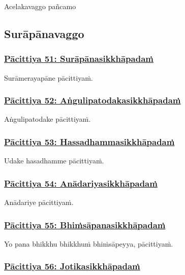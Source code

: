 \begin{center}
  Acelakavaggo pañcamo
\end{center}

\subsection{Surāpānavaggo}
\vspace{0.2cm}

\subsubsection*{\hyperref[exp51]{Pācittiya 51: Surāpānasikkhāpadaṁ}}
\label{pac51}

Surāmerayapāne pācittiyaṁ.

\subsubsection*{\hyperref[exp52]{Pācittiya 52: Aṅgulipatodakasikkhāpadaṁ}}
\label{pac52}

Aṅgulipatodake pācittiyaṁ.

\subsubsection*{\hyperref[exp53]{Pācittiya 53: Hassadhammasikkhāpadaṁ}}
\label{pac53}

Udake hasadhamme pācittiyaṁ.

\subsubsection*{\hyperref[exp54]{Pācittiya 54: Anādariyasikkhāpadaṁ}}
\label{pac54}

Anādariye pācittiyaṁ.

\subsubsection*{\hyperref[exp55]{Pācittiya 55: Bhiṁsāpanasikkhāpadaṁ}}
\label{pac55}

Yo pana bhikkhu bhikkhuṁ bhiṁsāpeyya, pācittiyaṁ.

\subsubsection*{\hyperref[exp56]{Pācittiya 56: Jotikasikkhāpadaṁ}}
\label{pac56}

